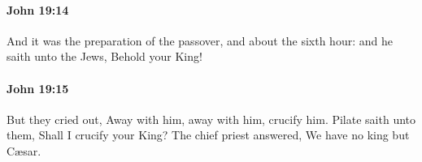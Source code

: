 		\paragraph{John 19:14} %
			\label{JOHN-19-14}

			And it was the preparation of the passover, and about the sixth hour: and he saith unto the Jews, Behold your King!

			\begin{framed}
			\scriptsize
				\begin{compactdesc}
					\item[SBLG]  \hyperref[DC19-19]{} 
				\end{compactdesc}
			\end{framed}

		\paragraph{John 19:15} %
			\label{JOHN-19-15}

			But they cried out, Away with him, away with him, crucify him. Pilate saith unto them, Shall I crucify your King? The chief priest answered, We have no king but Cæsar.

